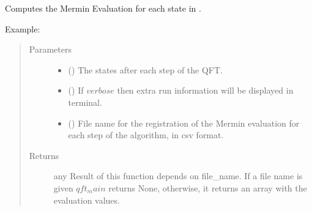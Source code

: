 \documentclass[letterpaper,10pt,english]{sphinxmanual}
\begin{document}

\begin{fulllineitems}
\label{\detokenize{qft:qft.qft_evaluate}}
Computes the Mermin Evaluation for each state in .
\begin{description}
\item[{Example:}] \leavevmode
{}%
\begin{sphinxVerbatim}[commandchars=\\\{\},formatcom=\footnotesize]
\PYG{p}{[}\PYG{p}{]}
\end{sphinxVerbatim}

\end{description}
\begin{quote}\begin{description}
\item[{Parameters}] \leavevmode\begin{itemize}
\item {} 
 (\sphinxstyleliteralemphasis{\sphinxupquote{{[}}}\sphinxstyleliteralemphasis{\sphinxupquote{{]}}}) \textendash{} The states after each step of the QFT.

\item {} 
 () \textendash{} If \(verbose\) then extra run information will be displayed 
in terminal.

\item {} 
 () \textendash{} File name for the registration of the Mermin evaluation 
for each step of the algorithm, in csv format.

\end{itemize}

\item[{Returns}] \leavevmode
any \textendash{} Result of this function depends on file\_name. If a file name
is given \(qft_main\) returns None, otherwise, it returns an array with the 
evaluation values.

\end{description}\end{quote}

\end{fulllineitems}
\end{document}
